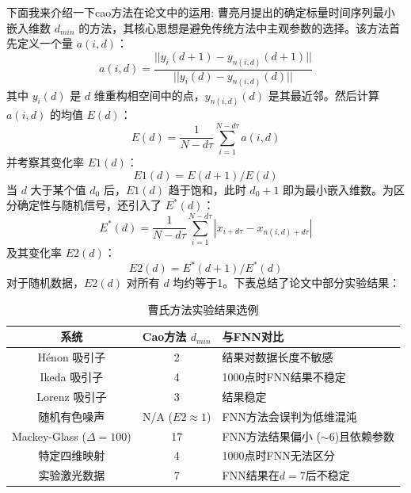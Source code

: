 下面我来介绍一下cao方法在论文中的运用:
曹亮月\cite{cao1997practical}提出的确定标量时间序列最小嵌入维数 $d_{min}$ 的方法，其核心思想是避免传统方法中主观参数的选择。该方法首先定义一个量 $a(i,d)$：
\begin{equation}
    a(i,d) = \frac{||y_i(d+1) - y_{n(i,d)}(d+1)||}{||y_i(d) - y_{n(i,d)}(d)||}
\end{equation}
其中 $y_i(d)$ 是 $d$ 维重构相空间中的点，$y_{n(i,d)}(d)$ 是其最近邻。然后计算 $a(i,d)$ 的均值 $E(d)$：
\begin{equation}
    E(d) = \frac{1}{N-d\tau}\sum_{i=1}^{N-d\tau} a(i,d)
\end{equation}
并考察其变化率 $E1(d)$：
\begin{equation}
    E1(d) = E(d+1)/E(d)
\end{equation}
当 $d$ 大于某个值 $d_0$ 后，$E1(d)$ 趋于饱和，此时 $d_0+1$ 即为最小嵌入维数。为区分确定性与随机信号，还引入了 $E^*(d)$：
\begin{equation}
    E^*(d) = \frac{1}{N-d\tau}\sum_{i=1}^{N-d\tau} |x_{i+d\tau} - x_{n(i,d)+d\tau}|
\end{equation}
及其变化率 $E2(d)$：
\begin{equation}
    E2(d) = E^*(d+1)/E^*(d)
\end{equation}
对于随机数据，$E2(d)$ 对所有 $d$ 均约等于1。下表总结了论文中部分实验结果：

\begin{table}[h!]
    \centering
    \caption{曹氏方法实验结果选例}
    \label{tab:cao_results_adjusted} %
    \begin{tabular}{|c|c|>{\centering\arraybackslash}p{3.5cm}|} %
        \hline
        \textbf{系统}                 & \textbf{Cao方法 $d_{min}$} & \textbf{与FNN对比}          \\
        \hline
        Hénon 吸引子                   & 2                        & 结果对数据长度不敏感               \\
        \hline
        Ikeda 吸引子                   & 4                        & 1000点时FNN结果不稳定           \\
        \hline
        Lorenz 吸引子                  & 3                        & 结果稳定                     \\
        \hline
        随机有色噪声                      & N/A ($E2 \approx 1$)     & FNN方法会误判为低维混沌            \\
        \hline
        Mackey-Glass ($\Delta=100$) & 17                       & FNN方法结果偏小 ($\sim$6)且依赖参数 \\
        \hline
        特定四维映射                      & 4                        & 1000点时FNN无法区分            \\
        \hline
        实验激光数据                      & 7                        & FNN结果在$d=7$后不稳定          \\
        \hline
    \end{tabular}
\end{table}

